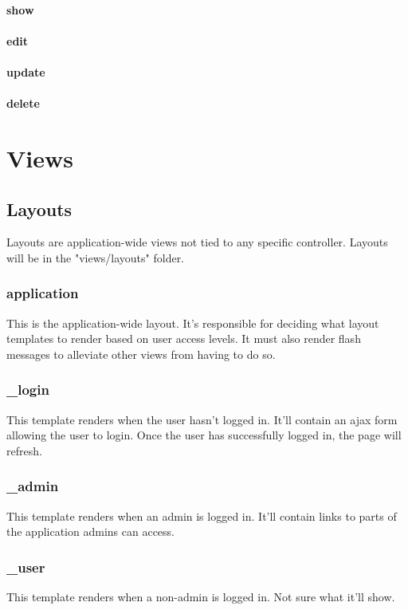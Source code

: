 \documentclass[12pt]{article}
\begin{document}
\paragraph{show}
\paragraph{edit}
\paragraph{update}
\paragraph{delete}


\section{Views}
\subsection{Layouts}
Layouts are application-wide views not tied to any specific controller. Layouts will be in the "views/layouts" folder.
\subsubsection{application}
This is the application-wide layout. It's responsible for deciding what layout templates to render based on user access levels.
It must also render flash messages to alleviate other views from having to do so.
\subsubsection{\_login}
This template renders when the user hasn't logged in. It'll contain an ajax form allowing the user to login.
Once the user has successfully logged in, the page will refresh.
\subsubsection{\_admin}
This template renders when an admin is logged in. It'll contain links to parts of the application admins can access.
\subsubsection{\_user}
This template renders when a non-admin is logged in. Not sure what it'll show.
\end{document}
